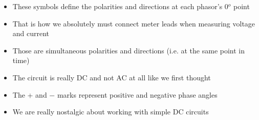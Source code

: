 \begin{itemize}
\item{} These symbols define the polarities and directions at each phasor's 0$^{o}$ point
\vskip 5pt 
\item{} That is how we absolutely must connect meter leads when measuring voltage and current
\vskip 5pt 
\item{} Those are simultaneous polarities and directions (i.e. at the same point in time)
\vskip 5pt 
\item{} The circuit is really DC and not AC at all like we first thought
\vskip 5pt 
\item{} The + and $-$ marks represent positive and negative phase angles 
\vskip 5pt 
\item{} We are really nostalgic about working with simple DC circuits
\end{itemize}





